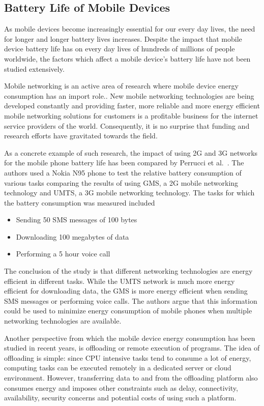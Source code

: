 \subsection{Battery Life of Mobile Devices}

As mobile devices become increasingly essential for our every day lives, the need for longer and longer battery lives increases. Despite the impact that mobile device battery life has on every day lives of hundreds of millions of people worldwide, the factors which affect a mobile device's battery life have not been studied extensively.

Mobile networking is an active area of research where mobile device energy consumption has an import role.. New mobile networking technologies are being developed constantly and providing faster, more reliable and more energy efficient mobile networking solutions for customers is a profitable business for the internet service providers of the world. Consequently, it is no surprise that funding and research efforts have gravitated towards the field.  

As a concrete example of such research, the impact of using 2G and 3G networks for the mobile phone battery life has been compared by Perrucci et al.~\cite{5357972}. The authors used a Nokia N95 phone to test the relative battery consumption of various tasks comparing the results of using GMS, a 2G mobile networking technology and UMTS, a 3G mobile networking technology. The tasks for which the battery consumption was measured included 

\begin{itemize}
\item Sending 50 SMS messages of 100 bytes
\item Downloading 100 megabytes of data
\item Performing a 5 hour voice call 
\end{itemize} 

The conclusion of the study is that different networking technologies are energy efficient in different tasks. While the UMTS network is much more energy efficient for downloading data, the GMS is more energy efficient when sending SMS messages or performing voice calls. The authors argue that this information could be used to minimize energy consumption of mobile phones when multiple networking technologies are available.       

Another perspective from which the mobile device energy consumption has been studied in recent years, is offloading or remote execution of programs. The idea of offloading is simple: since CPU intensive tasks tend to consume a lot of energy, computing tasks can be executed remotely in a dedicated server or cloud environment. However, transferring data to and from the offloading platform also consumes energy and imposes other constraints such as delay, connectivity, availability, security concerns and potential costs of using such a platform.

